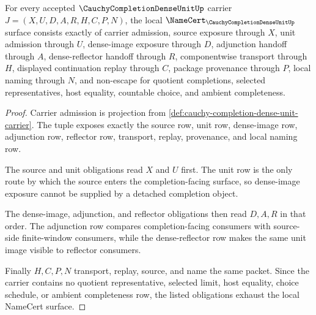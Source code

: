 \begin{theorem}
\label{thm:cauchy-completion-dense-unit-namecert-obligations}
For every accepted $\CauchyCompletionDenseUnitUp$ carrier $J=(X,U,D,A,R,H,C,P,N)$, the local $\NameCert_{\CauchyCompletionDenseUnitUp}$ surface consists exactly of carrier admission, source exposure through $X$, unit admission through $U$, dense-image exposure through $D$, adjunction handoff through $A$, dense-reflector handoff through $R$, componentwise transport through $H$, displayed continuation replay through $C$, package provenance through $P$, local naming through $N$, and non-escape for quotient completions, selected representatives, host equality, countable choice, and ambient completeness.
\end{theorem}
\begin{proof}
Carrier admission is projection from \autoref{def:cauchy-completion-dense-unit-carrier}. The tuple exposes exactly the source row, unit row, dense-image row, adjunction row, reflector row, transport, replay, provenance, and local naming row.

The source and unit obligations read $X$ and $U$ first. The unit row is the only route by which the source enters the completion-facing surface, so dense-image exposure cannot be supplied by a detached completion object.

The dense-image, adjunction, and reflector obligations then read $D,A,R$ in that order. The adjunction row compares completion-facing consumers with source-side finite-window consumers, while the dense-reflector row makes the same unit image visible to reflector consumers.

Finally $H,C,P,N$ transport, replay, source, and name the same packet. Since the carrier contains no quotient representative, selected limit, host equality, choice schedule, or ambient completeness row, the listed obligations exhaust the local NameCert surface.
\end{proof}


